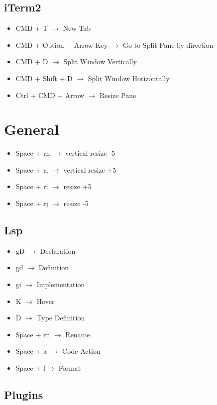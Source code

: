 \documentclass[12pt, a4paper]{article}
\begin{document}
\subsection{iTerm2}

\begin{itemize}
    \item CMD + T $\rightarrow$ New Tab
    \item CMD + Option + Arrow Key $\rightarrow$ Go to Split Pane by direction
    \item CMD + D $\rightarrow$ Split Window Vertically 
    \item CMD + Shift + D $\rightarrow$ Split Window Horizontally 
    \item Ctrl + CMD + Arrow $\rightarrow$ Resize Pane
\end{itemize}

\section{General}
\begin{itemize}
    \item Space + rh $\rightarrow$ vertical resize -5
    \item Space + rl $\rightarrow$ vertical resize +5
    \item Space + ri $\rightarrow$ resize +5
    \item Space + rj $\rightarrow$ resize -5
\end{itemize}

\subsection{Lsp}

\begin{itemize}
    \item gD $\rightarrow$ Declaration
    \item gd $\rightarrow$ Definition 
    \item gi $\rightarrow$ Implementation 
    \item K $\rightarrow$ Hover
    \item D $\rightarrow$ Type Definition
    \item Space + rn $\rightarrow$ Rename
    \item Space + a $\rightarrow$ Code Action
    \item Space + f$\rightarrow$ Format 
\end{itemize}

\subsection{Plugins}
\end{document}
